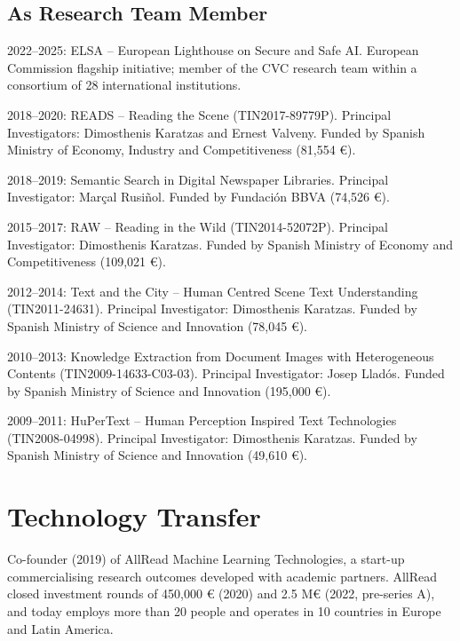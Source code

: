 \documentclass[11pt]{article}
\newenvironment{entries}{%
  \begin{list}{}{\setlength{\leftmargin}{3em}\setlength{\itemindent}{-1.5em}%
    \setlength{\itemsep}{0.35em}\setlength{\parsep}{0pt}\setlength{\topsep}{0.2em}}}%
  {\end{list}}
\begin{document}
\subsection*{As Research Team Member}
\begin{entries}
\item 2022--2025: ELSA -- European Lighthouse on Secure and Safe AI. European Commission flagship initiative; member of the CVC research team within a consortium of 28 international institutions.
\item 2018--2020: READS -- Reading the Scene (TIN2017-89779P). Principal Investigators: Dimosthenis Karatzas and Ernest Valveny. Funded by Spanish Ministry of Economy, Industry and Competitiveness (81,554 €).
\item 2018--2019: Semantic Search in Digital Newspaper Libraries. Principal Investigator: Marçal Rusiñol. Funded by Fundación BBVA (74,526 €).
\item 2015--2017: RAW -- Reading in the Wild (TIN2014-52072P). Principal Investigator: Dimosthenis Karatzas. Funded by Spanish Ministry of Economy and Competitiveness (109,021 €).
\item 2012--2014: Text and the City -- Human Centred Scene Text Understanding (TIN2011-24631). Principal Investigator: Dimosthenis Karatzas. Funded by Spanish Ministry of Science and Innovation (78,045 €).
\item 2010--2013: Knowledge Extraction from Document Images with Heterogeneous Contents (TIN2009-14633-C03-03). Principal Investigator: Josep Lladós. Funded by Spanish Ministry of Science and Innovation (195,000 €).
\item 2009--2011: HuPerText -- Human Perception Inspired Text Technologies (TIN2008-04998). Principal Investigator: Dimosthenis Karatzas. Funded by Spanish Ministry of Science and Innovation (49,610 €).
\end{entries}

\section*{Technology Transfer}
\begin{entries}
\item Co-founder (2019) of AllRead Machine Learning Technologies, a start-up commercialising research outcomes developed with academic partners. AllRead closed investment rounds of 450,000 € (2020) and 2.5 M€ (2022, pre-series A), and today employs more than 20 people and operates in 10 countries in Europe and Latin America.
\end{entries}
\end{document}
